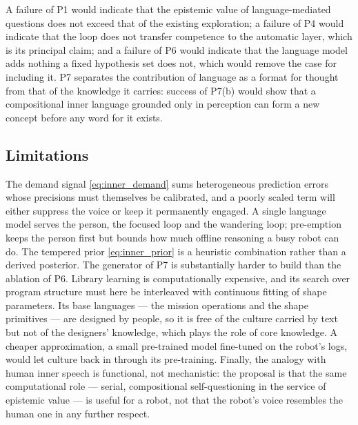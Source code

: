 A failure of P1 would indicate that the epistemic value of language-mediated questions does not exceed that of
the existing exploration; a failure of P4 would indicate that the loop does not transfer competence to the
automatic layer, which is its principal claim; and a failure of P6 would indicate that the language model adds
nothing a fixed hypothesis set does not, which would remove the case for including it. P7 separates the
contribution of language as a format for thought from that of the knowledge it carries: success of P7(b) would show
that a compositional inner language grounded only in perception can form a new concept before any word for it
exists.

\subsection{Limitations}
\label{sec:inner_speech:limitations}

The demand signal \eqref{eq:inner_demand} sums heterogeneous prediction errors whose precisions must themselves be
calibrated, and a poorly scaled term will either suppress the voice or keep it permanently engaged. A single
language model serves the person, the focused loop and the wandering loop; pre-emption keeps the person first but
bounds how much offline reasoning a busy robot can do. The tempered prior \eqref{eq:inner_prior} is a heuristic
combination rather than a derived posterior. The generator of P7 is substantially harder to build than the
ablation of P6. Library learning is computationally expensive, and its search over program structure must here be
interleaved with continuous fitting of shape parameters. Its base languages --- the mission operations and the shape
primitives --- are designed by people, so it is free of the culture carried by text but not of the designers'
knowledge, which plays the role of core knowledge. A cheaper approximation, a small pre-trained model fine-tuned on
the robot's logs, would let culture back in through its pre-training. Finally, the analogy with human inner speech
is functional, not
mechanistic: the proposal is that the same computational role --- serial, compositional self-questioning in the
service of epistemic value --- is useful for a robot, not that the robot's voice resembles the human one in any
further respect.
